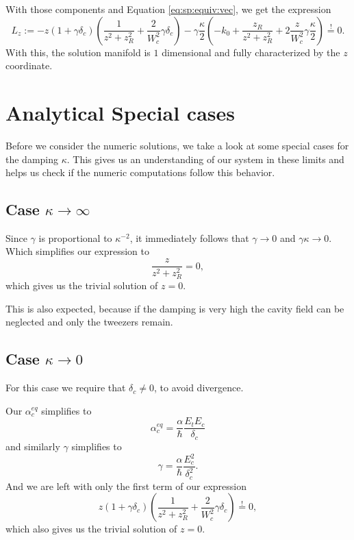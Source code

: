 With those components and Equation \eqref{eq:sp:equiv:vec}, we get the expression
\begin{equation}
    \label{eq:sp:z-stabil}
    L_z := -z (1+\gamma\delta_c) \left( \frac{1}{z^2+z_R^2} + \frac{2}{W_c^2} \gamma\delta_c \right)
        - \gamma \frac{\kappa}{2}
        \left( 
            - k_0 + \frac{z_R}{z^2+z_R^2} + 2\frac{z}{W_c^2} \gamma \frac{\kappa}{2}
        \right)
    \overset{!}{=} 0.
\end{equation}
With this, the solution manifold is $1$ dimensional 
    and fully characterized by the $z$ coordinate.


\section{Analytical Special cases}
\label{sec:sp:specialcases}

Before we consider the numeric solutions,
    we take a look at some special cases for the damping $\kappa$.
This gives us an understanding of our system in these limits
    and helps us check if the numeric computations follow this behavior.

\subsection{Case \texorpdfstring{$\kappa \rightarrow \infty$}{kappa -> infinity}}
\label{ssec:sp:specialcases:kapinft}

Since $\gamma$ is proportional to $\kappa^{-2}$, 
    it immediately follows that $\gamma \rightarrow 0$ 
    and $\gamma \kappa \rightarrow 0$.
Which simplifies our expression to
\begin{equation}
    \frac{z}{z^2+z_R^2} = 0,
\end{equation}
which gives us the trivial solution of $z = 0$.

This is also expected, 
    because if the damping is very high
    the cavity field can be neglected
    and only the tweezers remain.

\subsection{Case \texorpdfstring{$\kappa \rightarrow 0$}{kappa -> 0}}

For this case we require that $\delta_c \neq 0$,
    to avoid divergence.
    
Our $\alpha^{eq}_c$ simplifies to
\begin{equation}
    \alpha^{eq}_c = \frac{\alpha}{\hbar} \frac{E_t E_c}{\delta_c}
\end{equation} 
and similarly $\gamma$ simplifies to
\begin{equation}
    \gamma = \frac{\alpha}{\hbar} \frac{E_c^2}{\delta_c^2}.
\end{equation}
And we are left with only the first term of our expression
\begin{equation}
    z (1+\gamma\delta_c) \left( \frac{1}{z^2+z_R^2} + \frac{2}{W_c^2} \gamma\delta_c \right)
    \overset{!}{=}0,
\end{equation}
which also gives us the trivial solution of $z = 0$.

